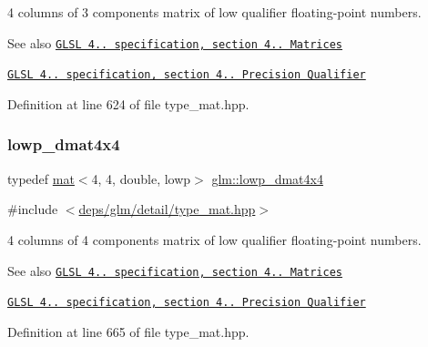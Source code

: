 4 columns of 3 components matrix of low qualifier floating-\/point numbers.

\begin{DoxySeeAlso}{See also}
\href{http://www.opengl.org/registry/doc/GLSLangSpec.4.20.8.pdf}{\tt G\+L\+SL 4.. specification, section 4.. Matrices} 

\href{http://www.opengl.org/registry/doc/GLSLangSpec.4.20.8.pdf}{\tt G\+L\+SL 4.. specification, section 4.. Precision Qualifier} 
\end{DoxySeeAlso}


Definition at line 624 of file type\+\_\+mat.\+hpp.

\mbox{\label{group__core__precision_ga336afc91799f59d9075eb94c3093612f}} 
\subsubsection{\texorpdfstring{lowp\+\_\+dmat4x4}{lowp\_dmat4x4}}
{\footnotesize\ttfamily typedef \hyperlink{structglm_1_1mat}{mat}$<$4, 4, double, lowp$>$ \hyperlink{group__core__precision_ga336afc91799f59d9075eb94c3093612f}{glm\+::lowp\+\_\+dmat4x4}}



{\ttfamily \#include $<$\hyperlink{type__mat_8hpp}{deps/glm/detail/type\+\_\+mat.\+hpp}$>$}

4 columns of 4 components matrix of low qualifier floating-\/point numbers.

\begin{DoxySeeAlso}{See also}
\href{http://www.opengl.org/registry/doc/GLSLangSpec.4.20.8.pdf}{\tt G\+L\+SL 4.. specification, section 4.. Matrices} 

\href{http://www.opengl.org/registry/doc/GLSLangSpec.4.20.8.pdf}{\tt G\+L\+SL 4.. specification, section 4.. Precision Qualifier} 
\end{DoxySeeAlso}


Definition at line 665 of file type\+\_\+mat.\+hpp.

\mbox{\label{group__core__precision_gab2db907304a5b726a369c351e02357fe}} 
